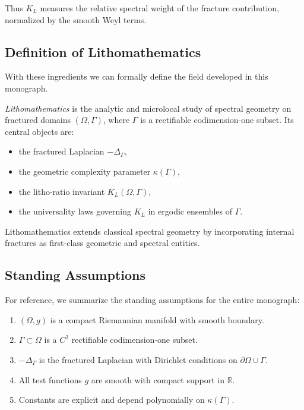 Thus $K_L$ measures the relative spectral weight of the fracture contribution,
normalized by the smooth Weyl terms.

\subsection{Definition of Lithomathematics}

With these ingredients we can formally define the field developed in this
monograph.

\begin{definition}[Lithomathematics]
\emph{Lithomathematics} is the analytic and microlocal study of spectral
geometry on fractured domains $(\Omega,\Gamma)$, where $\Gamma$ is a rectifiable
codimension-one subset. Its central objects are:
\begin{itemize}
  \item the fractured Laplacian $-\Delta_\Gamma$,
  \item the geometric complexity parameter $\kappa(\Gamma)$,
  \item the litho-ratio invariant $K_L(\Omega,\Gamma)$,
  \item the universality laws governing $K_L$ in ergodic ensembles of $\Gamma$.
\end{itemize}
Lithomathematics extends classical spectral geometry by incorporating internal
fractures as first-class geometric and spectral entities.
\end{definition}

\subsection{Standing Assumptions}

For reference, we summarize the standing assumptions for the entire monograph:

\begin{enumerate}[label=(S\arabic*)]
  \item $(\Omega,g)$ is a compact Riemannian manifold with smooth boundary.
  \item $\Gamma\subset\Omega$ is a $C^2$ rectifiable codimension-one subset.
  \item $-\Delta_\Gamma$ is the fractured Laplacian with Dirichlet conditions
  on $\partial\Omega\cup\Gamma$.
  \item All test functions $g$ are smooth with compact support in $\mathbb{R}$.
  \item Constants are explicit and depend polynomially on $\kappa(\Gamma)$.
\end{enumerate}

